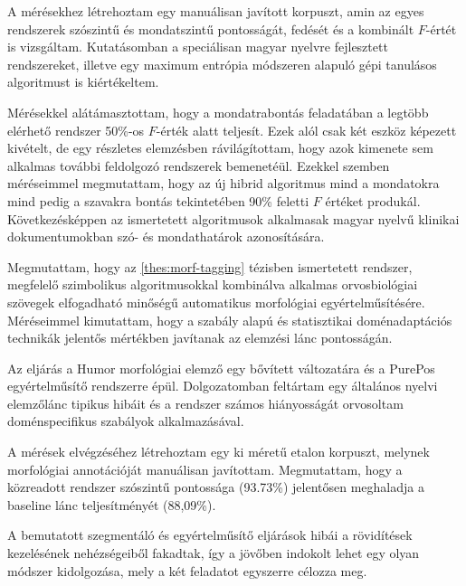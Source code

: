 A mérésekhez létrehoztam egy manuálisan javított korpuszt, amin az egyes rendszerek szószintű és mondatszintű pontosságát, fedését és a kombinált $F$-értét is vizsgáltam.  
Kutatásomban a speciálisan magyar nyelvre fejlesztett rendszereket, illetve egy maximum entrópia módszeren alapuló gépi tanulásos algoritmust is kiértékeltem.

Mérésekkel alátámasztottam, hogy a mondatrabontás feladatában a legtöbb elérhető rendszer 50\%-os $F$-érték alatt teljesít. 
Ezek alól csak két eszköz képezett kivételt, de egy részletes elemzésben rávilágítottam, hogy azok kimenete sem alkalmas további feldolgozó rendszerek bemenetéül.
Ezekkel szemben méréseimmel megmutattam, hogy az új hibrid algoritmus mind a mondatokra mind pedig a szavakra bontás tekintetében 90\% feletti $F$ értéket produkál. 
Következésképpen az ismertetett algoritmusok alkalmasak magyar nyelvű klinikai dokumentumokban szó- és mondathatárok azonosítására.

\thesisline%

\begin{core}
\begin{thesis}%
\label{thes:clin-pos}
Megmutattam, hogy az \ref{thes:morf-tagging} tézisben ismertetett rendszer, megfelelő szimbolikus algoritmusokkal kombinálva alkalmas orvosbiológiai szövegek elfogadható minőségű automatikus morfológiai egyértelműsítésére. 
Méréseimmel kimutattam, hogy a szabály alapú és statisztikai doménadaptációs technikák jelentős mértékben javítanak az elemzési lánc pontosságán.
\end{thesis}

\begin{pub}
\cite{Orosz2013,Orosz2014b} 
\end{pub}
\end{core}

Az eljárás a Humor morfológiai elemző egy bővített változatára és a PurePos egyértelműsítő rendszerre épül. 
Dolgozatomban feltártam egy általános nyelvi elemzőlánc tipikus hibáit és a rendszer számos hiányosságát orvosoltam doménspecifikus szabályok alkalmazásával. 

A mérések elvégzéséhez létrehoztam egy ki méretű etalon korpuszt, melynek morfológiai annotációját manuálisan javítottam. 
Megmutattam, hogy a közreadott rendszer szószintű pontossága (93.73\%) jelentősen meghaladja a baseline lánc teljesítményét (88,09\%). 

A bemutatott szegmentáló és egyértelműsítő eljárások hibái a rövidítések kezelésének nehézségeiből fakadtak, így a jövőben indokolt lehet egy olyan módszer kidolgozása, mely a két feladatot egyszerre célozza meg.

\let\thesubsection=\oldthesubsection
